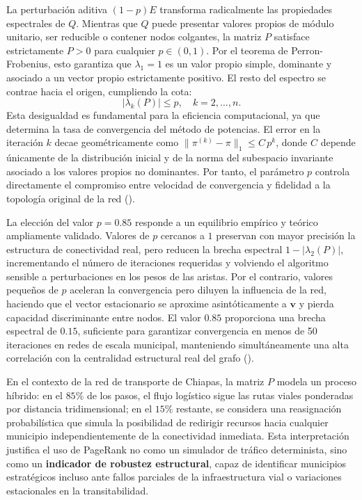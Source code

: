 \documentclass[
  spanish,
  us-letterpaper,
]{scrreprt}
\numberwithin{equation}{section}
\begin{document}
La perturbación aditiva \((1-p)E\) transforma radicalmente las
propiedades espectrales de \(Q\). Mientras que \(Q\) puede presentar
valores propios de módulo unitario, ser reducible o contener nodos
colgantes, la matriz \(P\) satisface estrictamente \(P > 0\) para
cualquier \(p \in (0,1)\). Por el teorema de Perron-Frobenius, esto
garantiza que \(\lambda_1 = 1\) es un valor propio simple, dominante y
asociado a un vector propio estrictamente positivo. El resto del
espectro se contrae hacia el origen, cumpliendo la cota: \[
|\lambda_k(P)| \leq p, \quad k = 2, \dots, n.
\] Esta desigualdad es fundamental para la eficiencia computacional, ya
que determina la tasa de convergencia del método de potencias. El error
en la iteración \(k\) decae geométricamente como
\(\|\pi^{(k)} - \pi\|_1 \leq C \, p^k\), donde \(C\) depende únicamente
de la distribución inicial y de la norma del subespacio invariante
asociado a los valores propios no dominantes. Por tanto, el parámetro
\(p\) controla directamente el compromiso entre velocidad de
convergencia y fidelidad a la topología original de la red
().

La elección del valor \(p = 0.85\) responde a un equilibrio empírico y
teórico ampliamente validado. Valores de \(p\) cercanos a \(1\)
preservan con mayor precisión la estructura de conectividad real, pero
reducen la brecha espectral \(1 - |\lambda_2(P)|\), incrementando el
número de iteraciones requeridas y volviendo el algoritmo sensible a
perturbaciones en los pesos de las aristas. Por el contrario, valores
pequeños de \(p\) aceleran la convergencia pero diluyen la influencia de
la red, haciendo que el vector estacionario se aproxime asintóticamente
a \(\mathbf{v}\) y pierda capacidad discriminante entre nodos. El valor
\(0.85\) proporciona una brecha espectral de \(0.15\), suficiente para
garantizar convergencia en menos de 50 iteraciones en redes de escala
municipal, manteniendo simultáneamente una alta correlación con la
centralidad estructural real del grafo
().

En el contexto de la red de transporte de Chiapas, la matriz \(P\)
modela un proceso híbrido: en el \(85\%\) de los pasos, el flujo
logístico sigue las rutas viales ponderadas por distancia
tridimensional; en el \(15\%\) restante, se considera una reasignación
probabilística que simula la posibilidad de redirigir recursos hacia
cualquier municipio independientemente de la conectividad inmediata.
Esta interpretación justifica el uso de PageRank no como un simulador de
tráfico determinista, sino como un \textbf{indicador de robustez
estructural}, capaz de identificar municipios estratégicos incluso ante
fallos parciales de la infraestructura vial o variaciones estacionales
en la transitabilidad.
\end{document}
